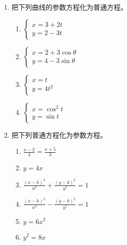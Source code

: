 \begin{ex}
\begin{enumerate}
    \item 把下列曲线的参数方程化为普通方程。
    \begin{multicols}{2}
\begin{enumerate}
    \item $\begin{cases}
        x=3+2t\\y=2-3t
    \end{cases}$
    \item $\begin{cases}
        x=2+3\cos\theta\\
        y=4-3\sin\theta
    \end{cases}$
    \item $\begin{cases}
        x=t\\y=4t^2
    \end{cases}$
    \item $\begin{cases}
        x=\cos^2 t\\ y=\sin t
    \end{cases}$
\end{enumerate}
    \end{multicols}

\item 把下列普通方程化为参数方程。
\begin{multicols}{2}
\begin{enumerate}
    \item $\frac{x-2}{4}=\frac{x+5}{3}$
    \item $y=4x$
    \item $\frac{(x-h)^2}{a^2}+\frac{(y-k)^2}{b^2}=1$
    \item $\frac{(x-h)^2}{a^2}-\frac{(y-k)^2}{b^2}=1$
    \item $y=6x^2$
    \item $y^2=8x$
\end{enumerate}
\end{multicols}
\end{enumerate}
\end{ex}

